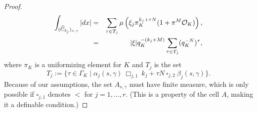 \begin{proof}
\begin{eqnarray*}
\int_{(\widehat{C}_{\delta_j})_{s,\gamma}}|dx|&=& \sum_{\tau \in T_j}\mu\left(\xi_j \pi_K^{k_j + \tau N} (1 + \pi^{M}{\mathcal O}_K)\right),\\
&=&|\xi|q_K^{-(k_j+M)}\sum_{\tau \in T_j} (q_K^{-N})^\tau,
\end{eqnarray*}
where $\pi_K$ is a uniformizing element for $K$ and $T_j$ is the set \[T_j:=\{\tau \in \Gamma_K \mid \alpha_j(s,\gamma ) \ \Box_{j,1}\ k_j + \tau N\ \square_{j,2}\ \beta_j(s,\gamma)\}.\]
Because of our assumptions, the set $A_{s,\gamma}$ must have finite measure, which is only possible if $\square_{j,1}$ denotes $<$ for $j = 1, \ldots, r$.
(This is a property of the cell $A$, making it a definable condition.)

\end{proof}
